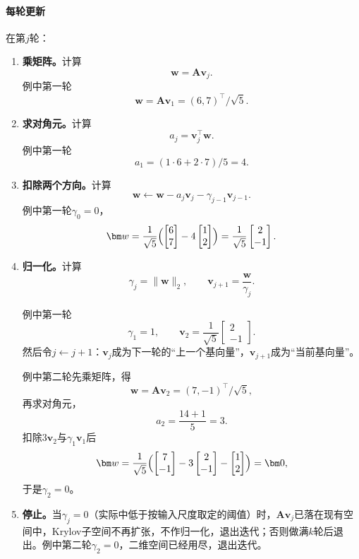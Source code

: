 \paragraph{每轮更新}
在第$j$轮：
\begin{enumerate}
 \item \textbf{乘矩阵。}计算
 \[
  \bm w=\bm A\bm v_j .
 \]
 例中第一轮
 \[
   \bm w=\bm A\bm v_1=(6,7)^\top/\sqrt5 .
 \]

 \item \textbf{求对角元。}计算
 \[
  a_j=\bm v_j^\top\bm w .
 \]
 例中第一轮
 \[
   a_1=(1\cdot6+2\cdot7)/5=4 .
 \]

 \item \textbf{扣除两个方向。}计算
 \[
  \bm w\leftarrow\bm w-a_j\bm v_j-\gamma_{j-1}\bm v_{j-1} .
 \]
 例中第一轮$\gamma_0=0$，
 \[
  \bm w=\frac1{\sqrt5}\Bigl(\begin{bmatrix}6\\7\end{bmatrix}-4\begin{bmatrix}1\\2\end{bmatrix}\Bigr)=\frac1{\sqrt5}\begin{bmatrix}2\\-1\end{bmatrix}.
 \]

 \item \textbf{归一化。}计算
 \[
  \gamma_j=\lVert\bm w\rVert_2,\qquad \bm v_{j+1}=\frac{\bm w}{\gamma_j} .
 \]
 
 例中第一轮
 \[
  \gamma_1=1,\qquad \bm v_2=\frac1{\sqrt5}\begin{bmatrix}2\\-1\end{bmatrix}.
 \]
 然后令$j\leftarrow j+1$：$\bm v_j$成为下一轮的“上一个基向量”，$\bm v_{j+1}$成为“当前基向量”。

 例中第二轮先乘矩阵，得
 \[
  \bm w=\bm A\bm v_2=(7,-1)^\top/\sqrt5 ,
 \]
 再求对角元，
 \[
  a_2=\frac{14+1}{5}=3 .
 \]
 扣除$3\bm v_2$与$\gamma_1\bm v_1$后
 \[
  \bm w=\frac1{\sqrt5}\Bigl(\begin{bmatrix}7\\-1\end{bmatrix}-3\begin{bmatrix}2\\-1\end{bmatrix}-\begin{bmatrix}1\\2\end{bmatrix}\Bigr)=\bm 0 ,
 \]
 于是$\gamma_2=0$。

 \item \textbf{停止。}当$\gamma_j=0$（实际中低于按输入尺度取定的阈值）时，$\bm A\bm v_j$已落在现有空间中，Krylov子空间不再扩张，不作归一化，退出迭代；否则做满$k$轮后退出。例中第二轮$\gamma_2=0$，二维空间已经用尽，退出迭代。
\end{enumerate}
